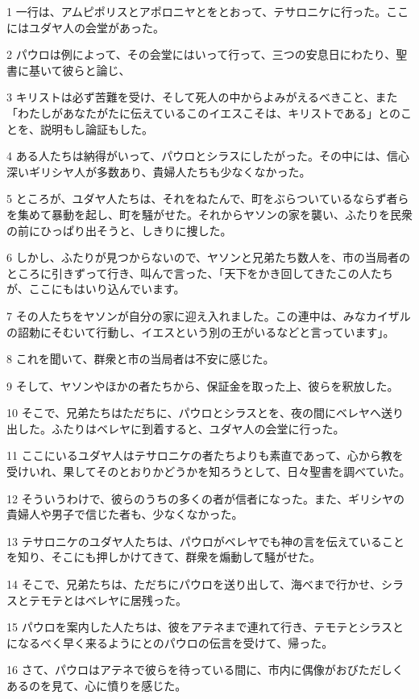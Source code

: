 \par 1 一行は、アムピポリスとアポロニヤとをとおって、テサロニケに行った。ここにはユダヤ人の会堂があった。
\par 2 パウロは例によって、その会堂にはいって行って、三つの安息日にわたり、聖書に基いて彼らと論じ、
\par 3 キリストは必ず苦難を受け、そして死人の中からよみがえるべきこと、また「わたしがあなたがたに伝えているこのイエスこそは、キリストである」とのことを、説明もし論証もした。
\par 4 ある人たちは納得がいって、パウロとシラスにしたがった。その中には、信心深いギリシヤ人が多数あり、貴婦人たちも少なくなかった。
\par 5 ところが、ユダヤ人たちは、それをねたんで、町をぶらついているならず者らを集めて暴動を起し、町を騒がせた。それからヤソンの家を襲い、ふたりを民衆の前にひっぱり出そうと、しきりに捜した。
\par 6 しかし、ふたりが見つからないので、ヤソンと兄弟たち数人を、市の当局者のところに引きずって行き、叫んで言った、「天下をかき回してきたこの人たちが、ここにもはいり込んでいます。
\par 7 その人たちをヤソンが自分の家に迎え入れました。この連中は、みなカイザルの詔勅にそむいて行動し、イエスという別の王がいるなどと言っています」。
\par 8 これを聞いて、群衆と市の当局者は不安に感じた。
\par 9 そして、ヤソンやほかの者たちから、保証金を取った上、彼らを釈放した。
\par 10 そこで、兄弟たちはただちに、パウロとシラスとを、夜の間にベレヤへ送り出した。ふたりはベレヤに到着すると、ユダヤ人の会堂に行った。
\par 11 ここにいるユダヤ人はテサロニケの者たちよりも素直であって、心から教を受けいれ、果してそのとおりかどうかを知ろうとして、日々聖書を調べていた。
\par 12 そういうわけで、彼らのうちの多くの者が信者になった。また、ギリシヤの貴婦人や男子で信じた者も、少なくなかった。
\par 13 テサロニケのユダヤ人たちは、パウロがベレヤでも神の言を伝えていることを知り、そこにも押しかけてきて、群衆を煽動して騒がせた。
\par 14 そこで、兄弟たちは、ただちにパウロを送り出して、海べまで行かせ、シラスとテモテとはベレヤに居残った。
\par 15 パウロを案内した人たちは、彼をアテネまで連れて行き、テモテとシラスとになるべく早く来るようにとのパウロの伝言を受けて、帰った。
\par 16 さて、パウロはアテネで彼らを待っている間に、市内に偶像がおびただしくあるのを見て、心に憤りを感じた。
